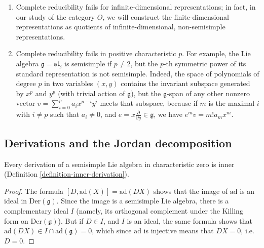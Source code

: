 \begin{remarks}
 \label{remarks-complete-reducibility}
 \begin{enumerate}
  \item Complete reducibility fails for infinite-dimensional representations; in fact, in our study of the category $O$, we will construct the finite-dimensional representations as quotients of infinite-dimensional, non-semisimple representations.
  \item Complete reducibility fails in positive characteristic $p$. For example, the Lie algebra $\mathfrak g=\mathfrak{sl}_2$ is semisimple if $p\ne 2$, but the $p$-th symmetric power of its standard representation is not semisimple. Indeed, the space of polynomials of degree $p$ in two variables $(x,y)$ contains the invariant subspace generated by $x^p$ and $y^p$ (with trivial action of $\mathfrak g$), but the $\mathfrak g$-span of any other nonzero vector $v=\sum_{i=0}^p a_i x^{p-i} y^i$ meets that subspace, because if $m$ is the maximal $i$ with $i\ne p$ such that $a_i\ne 0$, and $e= x \frac{\partial}{\partial y} \in \mathfrak g$, we have $e^m v = m! a_m x^m$. 
 \end{enumerate}

\end{remarks}


\subsection{Derivations and the Jordan decomposition}
\label{subsection-derivations-Jordan}



\begin{proposition}
\label{proposition-derivations-inner}
 Every derivation of a semisimple Lie algebra in characteristic zero is inner (Definition \ref{definition-inner-derivation}).
\end{proposition}

\begin{proof}
 The formula $[D,\text{ad}(X)]=\text{ad}(DX)$ shows that the image of $\text{ad}$ is an ideal in $\text{Der}(\mathfrak g)$. Since the image is a semisimple Lie algebra, there is a complementary ideal $I$ (namely, its orthogonal complement under the Killing form on $\text{Der}(\mathfrak g)$). But if $D\in I$, and $I$ is an ideal, the same formula shows that $\text{ad}(DX)\in I\cap \text{ad}(\mathfrak g)=0$, which since $\text{ad}$ is injective means that $DX=0$, i.e.\ $D=0$.
\end{proof}

